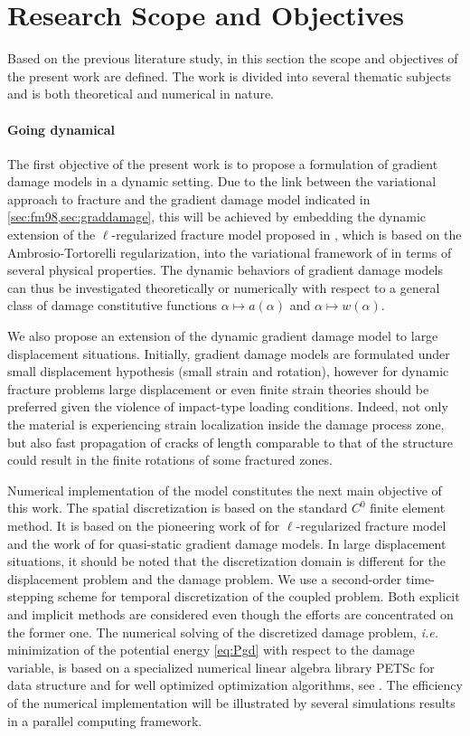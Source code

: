 \section{Research Scope and Objectives} \label{sec:scope}
Based on the previous literature study, in this section the scope and objectives of the present work are defined. The work is divided into several thematic subjects and is both theoretical and numerical in nature.

\paragraph{Going dynamical} The first objective of the present work is to propose a formulation of gradient damage models in a dynamic setting. Due to the link between the variational approach to fracture and the gradient damage model indicated in \cref{sec:fm98,sec:graddamage}, this will be achieved by embedding the dynamic extension of the $\ell$-regularized fracture model proposed in \cite{Bourdin:2011}, which is based on the Ambrosio-Tortorelli regularization, into the variational framework of \cite{PhamMarigo:2010-1} in terms of several physical properties. The dynamic behaviors of gradient damage models can thus be investigated theoretically or numerically with respect to a general class of damage constitutive functions $\alpha\mapsto a(\alpha)$ and $\alpha\mapsto w(\alpha)$.

We also propose an extension of the dynamic gradient damage model to large displacement situations. Initially, gradient damage models are formulated under small displacement hypothesis (small strain and rotation), however for dynamic fracture problems large displacement or even finite strain theories should be preferred given the violence of impact-type loading conditions. Indeed, not only the material is experiencing strain localization inside the damage process zone, but also fast propagation of cracks of length comparable to that of the structure could result in the finite rotations of some fractured zones.

Numerical implementation of the model constitutes the next main objective of this work. The spatial discretization is based on the standard $C^0$ finite element method. It is based on the pioneering work of \cite{BourdinFrancfortMarigo:2000} for $\ell$-regularized fracture model and the work of \cite{PhamAmorMarigoMaurini:2011} for quasi-static gradient damage models. In large displacement situations, it should be noted that the discretization domain is different for the displacement problem and the damage problem. We use a second-order time-stepping scheme for temporal discretization of the coupled problem. Both explicit and implicit methods are considered even though the efforts are concentrated on the former one. The numerical solving of the discretized damage problem, \emph{i.e.} minimization of the potential energy \eqref{eq:Pgd} with respect to the damage variable, is based on a specialized numerical linear algebra library PETSc for data structure and for well optimized optimization algorithms, see \cite{PETSc:2015}. The efficiency of the numerical implementation will be illustrated by several simulations results in a parallel computing framework.

